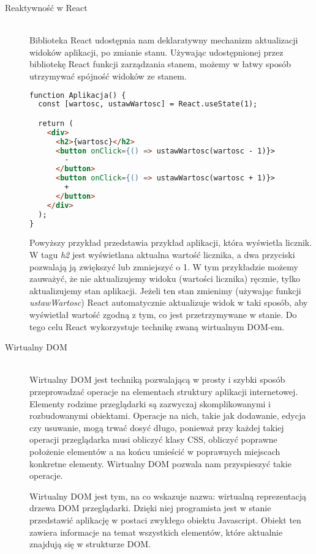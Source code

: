 \begin{description}
\item[Reaktywność w React] \hfill \\ Biblioteka React udostępnia nam deklaratywny mechanizm aktualizacji widoków aplikacji, po zmianie stanu. Używając udostępnionej przez bibliotekę React funkcji zarządzania stanem, możemy w łatwy sposób utrzymywać spójność widoków ze stanem.

\begin{lstlisting}[language=HTML, caption=Użycie mechanizmu zarządzania stanem w React, label={lst:reactCounterCode}]
function Aplikacja() {
  const [wartosc, ustawWartosc] = React.useState(1);

  return (
    <div>
      <h2>{wartosc}</h2>
      <button onClick={() => ustawWartosc(wartosc - 1)}>
        -
      </button>
      <button onClick={() => ustawWartosc(wartosc + 1)}>
        +
      </button>
    </div>
  );
}
\end{lstlisting}

Powyższy przykład przedstawia przykład aplikacji, która wyświetla licznik. W tagu \emph{h2} jest wyświetlana aktualna wartość licznika, a dwa przyciski pozwalają ją zwiększyć lub zmniejszyć o 1. W tym przykładzie możemy zauważyć, że nie aktualizujemy widoku (wartości licznika) ręcznie, tylko aktualizujemy stan aplikacji. Jeżeli ten stan zmienimy (używając funkcji \emph{ustawWartosc}) React automatycznie aktualizuje widok w taki sposób, aby wyświetlał wartość zgodną z tym, co jest przetrzymywane w stanie. Do tego celu React wykorzystuje technikę zwaną wirtualnym DOM-em.
  \vspace{0.4cm}

  \item[Wirtualny DOM] \hfill \\ Wirtualny DOM jest techniką pozwalającą w prosty i szybki sposób przeprowadzać operacje na elementach struktury aplikacji internetowej. Elementy rodzime przeglądarki są zazwyczaj skomplikowanymi i rozbudowanymi obiektami. Operacje na nich, takie jak dodawanie, edycja czy usuwanie, mogą trwać dosyć długo, ponieważ przy każdej takiej operacji przeglądarka musi obliczyć klasy CSS, obliczyć poprawne położenie elementów a na końcu umieścić w poprawnych miejscach konkretne elementy. Wirtualny DOM pozwala nam przyspieszyć takie operacje.

  Wirtualny DOM jest tym, na co wskazuje nazwa: wirtualną reprezentacją drzewa DOM przeglądarki. Dzięki niej programista jest w stanie przedstawić aplikację w postaci zwykłego obiektu Javascript. Obiekt ten zawiera informacje na temat wszystkich elementów, które aktualnie znajdują się w strukturze DOM.


\end{description}
